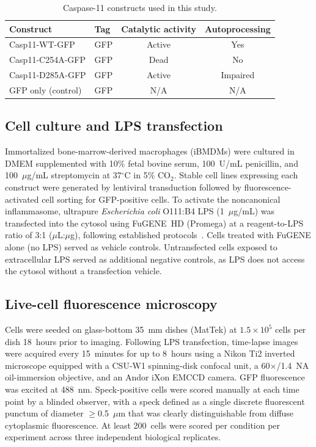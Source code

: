 \documentclass[11pt,a4paper]{article}
\begin{document}
\begin{table}[htbp]
\centering
\caption{Caspase-11 constructs used in this study.}
\label{tab:constructs}
\begin{tabular}{@{}llcc@{}}
\toprule
\textbf{Construct} & \textbf{Tag} & \textbf{Catalytic activity} & \textbf{Autoprocessing} \\
\midrule
Casp11-WT-GFP     & GFP & Active & Yes \\
Casp11-C254A-GFP  & GFP & Dead   & No  \\
Casp11-D285A-GFP  & GFP & Active & Impaired \\
GFP only (control) & GFP & N/A   & N/A \\
\bottomrule
\end{tabular}
\end{table}

\subsection{Cell culture and LPS transfection}

Immortalized bone-marrow-derived macrophages (iBMDMs) were cultured in DMEM supplemented with 10\% fetal bovine serum, 100~U/mL penicillin, and 100~$\mu$g/mL streptomycin at 37$^\circ$C in 5\% CO$_2$. Stable cell lines expressing each construct were generated by lentiviral transduction followed by fluorescence-activated cell sorting for GFP-positive cells. To activate the noncanonical inflammasome, ultrapure \textit{Escherichia coli} O111:B4 LPS (1~$\mu$g/mL) was transfected into the cytosol using FuGENE~HD (Promega) at a reagent-to-LPS ratio of 3:1 ($\mu$L:$\mu$g), following established protocols~\citep{shi2014, hagar2013}. Cells treated with FuGENE alone (no LPS) served as vehicle controls. Untransfected cells exposed to extracellular LPS served as additional negative controls, as LPS does not access the cytosol without a transfection vehicle.

\subsection{Live-cell fluorescence microscopy}

Cells were seeded on glass-bottom 35~mm dishes (MatTek) at $1.5 \times 10^5$ cells per dish 18~hours prior to imaging. Following LPS transfection, time-lapse images were acquired every 15~minutes for up to 8~hours using a Nikon Ti2 inverted microscope equipped with a CSU-W1 spinning-disk confocal unit, a 60$\times$/1.4~NA oil-immersion objective, and an Andor iXon EMCCD camera. GFP fluorescence was excited at 488~nm. Speck-positive cells were scored manually at each time point by a blinded observer, with a speck defined as a single discrete fluorescent punctum of diameter $\geq$0.5~$\mu$m that was clearly distinguishable from diffuse cytoplasmic fluorescence. At least 200~cells were scored per condition per experiment across three independent biological replicates.
\end{document}
